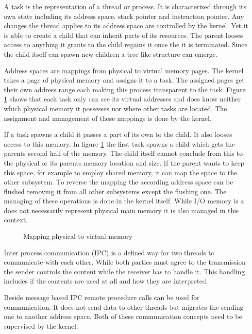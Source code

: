 \documentclass[
a4paper,
12pt,
notitlepage,
parskip=half,
DIV=11,
]{scrbook}
\begin{document}
		A task is the representation of a thread or process.
		It is characterized through its own state including its address space, stack pointer and instruction pointer.
		Any changes the thread applies to its address space are controlled by the kernel.
		Yet it is able to create a child that can inherit parts of its resources.
		The parent looses access to anything it grants to the child regains it once the it is terminated.
		Since the child itself can spawn new children a tree like structure can emerge.
		
		Address spaces are mappings from physical to virtual memory pages.
		The kernel takes a page of physical memory and assigns it to a task.
		The assigned pages get their own address range each making this process transparent to the task.
		Figure \ref{mapping} shows that each task only can see its virtual addresses and does know neither which physical memory it possesses nor where other tasks are located.
		The assignment and management of these mappings is done by the kernel.
		
		If a task spawns a child it passes a part of its own to the child.
		It also looses access to this memory.
		In figure \ref{mapping} the first task spawns a child which gets the parents second half of the memory.
		The child itself cannot conclude from this to the physical or its parents memory location and size.
		If the parent wants to keep this space, for example to employ shared memory, it can map the space to the other subsystem.
		To reverse the mapping the according address space can be flushed removing it from all other subsystems except the flushing one.
		The managing of these operations is done in the kernel itself.
		While I/O memory is a does not necessarily represent physical main memory it is also managed in this context.
		
		\begin{figure}
			\centering
			\def\svgwidth{\textwidth}
			
			\caption{Mapping physical to virtual memory}
			\label{mapping}    
		\end{figure}
		
		Inter process communication (IPC) is a defined way for two threads to communicate with each other.
		While both parties must agree to the transmission the sender controls the content while the receiver has to handle it.
		This handling includes if the contents are used at all and how they are interpreted.
		
		Beside message based IPC remote procedure calls can be used for communication.
		It does not send data to other threads but migrates the sending one to another address space.
		Both of these communication concepts need to be supervised by the kernel.
		
\end{document}
